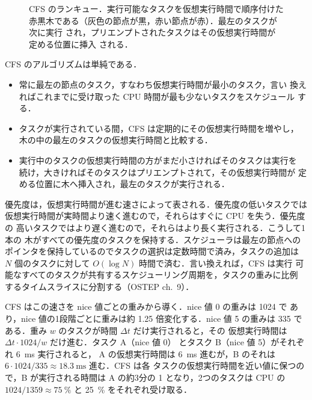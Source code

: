 \documentclass[../main.tex]{subfiles}
\begin{document}
\begin{figure}[htbp]
  \centering
  
  \caption{CFS のランキュー．実行可能なタスクを仮想実行時間で順序付けた
    赤黒木である（灰色の節点が黒，赤い節点が赤）．最左のタスクが次に実行
    され，プリエンプトされたタスクはその仮想実行時間が定める位置に挿入
    される．}
  \label{fig:l07-cfs}
\end{figure}

CFS のアルゴリズムは単純である．
\begin{itemize}
  \item 常に最左の節点のタスク，すなわち仮想実行時間が最小のタスク，言い
    換えればこれまでに受け取った CPU 時間が最も少ないタスクをスケジュール
    する．
  \item タスクが実行されている間，CFS は定期的にその仮想実行時間を増やし，
    木の中の最左のタスクの仮想実行時間と比較する．
  \item 実行中のタスクの仮想実行時間の方がまだ小さければそのタスクは実行を
    続け，大きければそのタスクはプリエンプトされて，その仮想実行時間が
    定める位置に木へ挿入され，最左のタスクが実行される．
\end{itemize}

優先度は，仮想実行時間が進む速さによって表される．優先度の低いタスクでは
仮想実行時間が実時間より速く進むので，それらはすぐに CPU を失う．優先度の
高いタスクではより遅く進むので，それらはより長く実行される．こうして1本の
木がすべての優先度のタスクを保持する．スケジューラは最左の節点への
ポインタを保持しているのでタスクの選択は定数時間で済み，タスクの追加は
$N$ 個のタスクに対して $O(\log N)$ 時間で済む．言い換えれば，CFS は実行
可能なすべてのタスクが共有するスケジューリング周期を，タスクの重みに比例
するタイムスライスに分割する（OSTEP ch.~9）．

\begin{example}
  CFS はこの速さを nice 値ごとの重みから導く．nice 値 0 の重みは 1024 で
  あり，nice 値の1段階ごとに重みは約 1.25 倍変化する．nice 値 5 の重みは
  335 である．重み $w$ のタスクが時間 $\Delta t$ だけ実行されると，その
  仮想実行時間は $\Delta t \cdot 1024/w$ だけ進む．タスク A（nice 値 0）
  とタスク B（nice 値 5）がそれぞれ \SI{6}{\milli\second} 実行されると，
  A の仮想実行時間は \SI{6}{\milli\second} 進むが，B のそれは
  $6 \cdot 1024/335 \approx \SI{18.3}{\milli\second}$ 進む．CFS は各
  タスクの仮想実行時間を近い値に保つので，B が実行される時間は A の約3分の
  1 となり，2つのタスクは CPU の $1024/1359 \approx \SI{75}{\percent}$ と
  \SI{25}{\percent} をそれぞれ受け取る．
\end{example}
\end{document}
